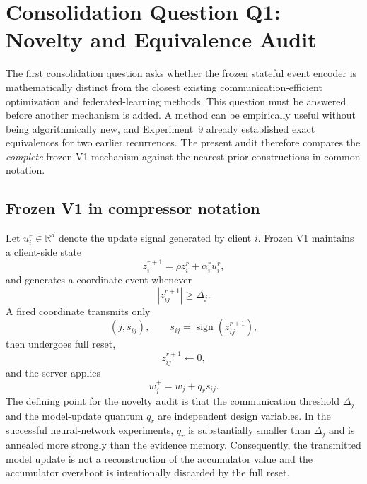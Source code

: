 \section{Consolidation Question Q1: Novelty and Equivalence Audit}
\label{sec:consolidation-q1}

The first consolidation question asks whether the frozen stateful event encoder is mathematically distinct from the closest existing communication-efficient optimization and federated-learning methods. This question must be answered before another mechanism is added. A method can be empirically useful without being algorithmically new, and Experiment~9 already established exact equivalences for two earlier recurrences. The present audit therefore compares the \emph{complete} frozen V1 mechanism against the nearest prior constructions in common notation.

\subsection{Frozen V1 in compressor notation}

Let $u_i^r\in\mathbb{R}^d$ denote the update signal generated by client $i$. Frozen V1 maintains a client-side state
\begin{equation}
 z_i^{r+1}=\rho z_i^r+\alpha_i^r u_i^r,
 \label{eq:q1-v1-state}
\end{equation}
and generates a coordinate event whenever
\begin{equation}
 |z_{ij}^{r+1}|\geq \Delta_j.
\end{equation}
A fired coordinate transmits only
\begin{equation}
 (j,s_{ij}),\qquad s_{ij}=\operatorname{sign}(z_{ij}^{r+1}),
\end{equation}
then undergoes full reset,
\begin{equation}
 z_{ij}^{r+1}\leftarrow0,
 \label{eq:q1-v1-reset}
\end{equation}
and the server applies
\begin{equation}
 w_j^+=w_j+q_r s_{ij}.
 \label{eq:q1-v1-jump}
\end{equation}
The defining point for the novelty audit is that the communication threshold $\Delta_j$ and the model-update quantum $q_r$ are independent design variables. In the successful neural-network experiments, $q_r$ is substantially smaller than $\Delta_j$ and is annealed more strongly than the evidence memory. Consequently, the transmitted model update is not a reconstruction of the accumulator value and the accumulator overshoot is intentionally discarded by the full reset.

